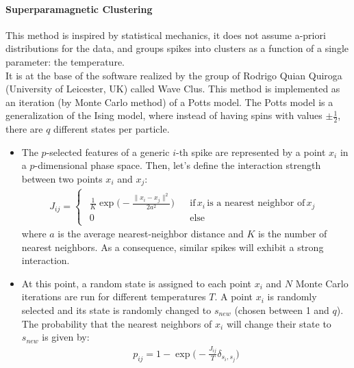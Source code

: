 \paragraph{Superparamagnetic Clustering}
This method is inspired by statistical mechanics, it does not assume a-priori distributions
for the data, and groups spikes into clusters as a function of a single parameter: the
temperature.\\
It is at the base of the software realized by the group of Rodrigo Quian Quiroga
(University of Leicester, UK) called Wave Clus. This method is implemented as an
iteration (by Monte Carlo method) of a Potts model. The Potts model is a generalization
of the Ising model, where instead of having spins with values \(\pm\frac{1}{2}\), there
are \(q\) different states per particle.
\begin{itemize}
    \item The \(p\)-selected features of a generic \(i\)-th spike are represented by a
          point \(x_i\) in a \(p\)-dimensional phase space. Then, let's define the
          interaction strength between two points \(x_i\) and \(x_j\):
          \begin{align*}
              J_{ij}=
              \begin{cases}
                  \begin{matrix}
                      \frac{1}{K}\exp{\biggl(-\frac{\|x_i-x_j\|^2}{2a^2}\biggr)} &  & \text{if}\,x_i\,\text{is a nearest neighbor of}\,x_j \\
                      0                                                          &  & \text{else}
                  \end{matrix}
              \end{cases}
          \end{align*}
          where \(a\) is the average nearest-neighbor distance and \(K\) is the number
          of nearest neighbors. As a consequence, similar spikes will exhibit a strong
          interaction.
    \item At this point, a random state is assigned to each point \(x_i\) and \(N\)
          Monte Carlo iterations are run for different temperatures \(T\). A point \(x_i\)
          is randomly selected and its state is randomly changed to \(s_{new}\)
          (chosen between 1 and \(q\)). The probability that the nearest neighbors of \(x_i\)
          will change their state to \(s_{new}\) is given by:
          \begin{align*}
              p_{ij}=1-\exp{\biggl(-\frac{J_{ij}}{T}\delta_{s_i,s_j}\biggr)}

\end{align*}
\end{itemize}
